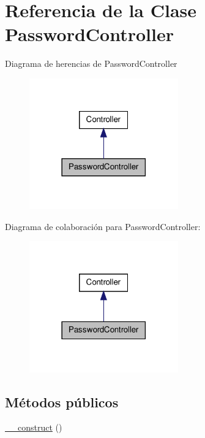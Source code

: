 \hypertarget{class_app_1_1_http_1_1_controllers_1_1_auth_1_1_password_controller}{\section{\-Referencia de la \-Clase \-Password\-Controller}
\label{class_app_1_1_http_1_1_controllers_1_1_auth_1_1_password_controller}
}


\-Diagrama de herencias de \-Password\-Controller
\nopagebreak
\begin{figure}[H]
\begin{center}
\leavevmode
\includegraphics[width=182pt]{class_app_1_1_http_1_1_controllers_1_1_auth_1_1_password_controller__inherit__graph}
\end{center}
\end{figure}


\-Diagrama de colaboración para \-Password\-Controller\-:
\nopagebreak
\begin{figure}[H]
\begin{center}
\leavevmode
\includegraphics[width=182pt]{class_app_1_1_http_1_1_controllers_1_1_auth_1_1_password_controller__coll__graph}
\end{center}
\end{figure}
\subsection*{\-Métodos públicos}
\begin{DoxyCompactItemize}
\item 
\hyperlink{class_app_1_1_http_1_1_controllers_1_1_auth_1_1_password_controller_a095c5d389db211932136b53f25f39685}{\-\_\-\-\_\-construct} ()
\end{DoxyCompactItemize}


